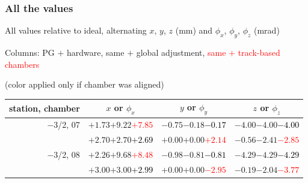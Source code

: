 \documentclass[compress]{beamer}
\begin{document}
\begin{frame}
\frametitle{All the values}
\tiny

All values relative to ideal, alternating $x$, $y$, $z$ (mm) and $\phi_x$, $\phi_y$, $\phi_z$ (mrad)

Columns: PG $+$ hardware, same $+$ global adjustment, \textcolor{red}{same $+$ track-based chambers}

\hfill (color applied only if chamber was aligned)

\vfill
\renewcommand{\arraystretch}{1.1}
\begin{tabular}{r | c | c | c}
station, chamber & $x$ or $\phi_x$ & $y$ or $\phi_y$ & $z$ or $\phi_z$ \\\hline
$-$3/2, 07 & $+1.73$\hspace{0.1 cm}$+9.22$\hspace{0.1 cm}\textcolor{red}{$+7.85$} & $-0.75$\hspace{0.1 cm}$-0.18$\hspace{0.1 cm}\textcolor{black}{$-0.17$} & $-4.00$\hspace{0.1 cm}$-4.00$\hspace{0.1 cm}\textcolor{black}{$-4.00$} \\
           & $+2.70$\hspace{0.1 cm}$+2.70$\hspace{0.1 cm}\textcolor{black}{$+2.69$} & $+0.00$\hspace{0.1 cm}$+0.00$\hspace{0.1 cm}\textcolor{red}{$+2.14$} & $-0.56$\hspace{0.1 cm}$-2.41$\hspace{0.1 cm}\textcolor{red}{$-2.85$} \\
$-$3/2, 08 & $+2.26$\hspace{0.1 cm}$+9.68$\hspace{0.1 cm}\textcolor{red}{$+8.48$} & $-0.98$\hspace{0.1 cm}$-0.81$\hspace{0.1 cm}\textcolor{black}{$-0.81$} & $-4.29$\hspace{0.1 cm}$-4.29$\hspace{0.1 cm}\textcolor{black}{$-4.29$} \\
           & $+3.00$\hspace{0.1 cm}$+3.00$\hspace{0.1 cm}\textcolor{black}{$+2.99$} & $+0.00$\hspace{0.1 cm}$+0.00$\hspace{0.1 cm}\textcolor{red}{$-2.95$} & $-0.19$\hspace{0.1 cm}$-2.04$\hspace{0.1 cm}\textcolor{red}{$-3.77$} \\

\end{tabular}
\end{frame}
\end{document}
